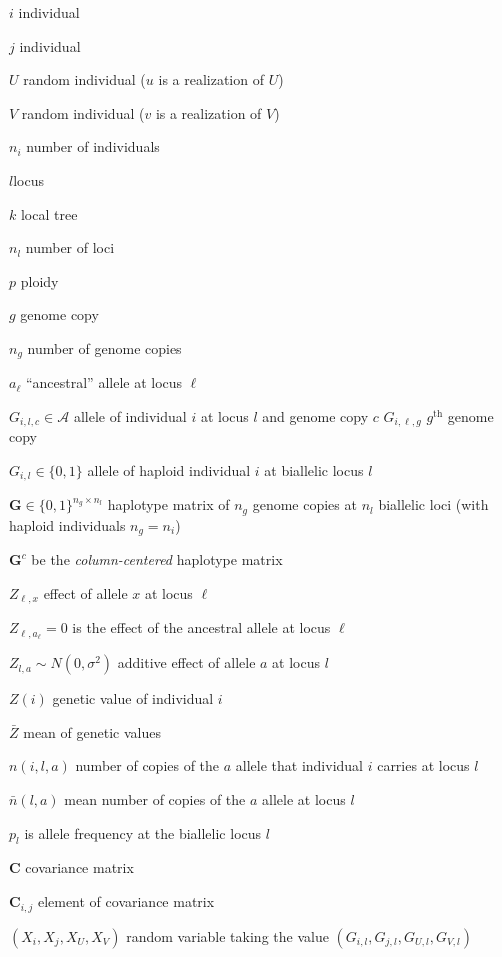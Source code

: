 $i$ individual

$j$ individual

$U$ random individual ($u$ is a realization of $U$) %

$V$ random individual ($v$ is a realization of $V$) %

$n_i$ number of individuals

$l$locus %

$k$ local tree

$n_l$ number of loci

$p$ ploidy

$g$ genome copy

$n_g$ number of genome copies

$a_\ell$ ``ancestral'' allele at locus $\ell$

$G_{i,l,c} \in \mathcal{A}$ allele of individual $i$ at locus $l$ and genome copy $c$
$G_{i,\ell,g}$ $g^\text{th}$ genome copy

$G_{i,l} \in \lbrace 0, 1 \rbrace$ allele of haploid individual $i$ at biallelic locus $l$

$\mathbf{G} \in \{0, 1\}^{n_g \times n_l}$ haplotype matrix of $n_g$ genome copies at $n_l$ biallelic loci (with haploid individuals $n_g = n_i$)

$\mathbf{G}^c$ be the \textit{column-centered} haplotype matrix

$Z_{\ell,x}$ effect of allele $x$ at locus $\ell$

$Z_{\ell,a_\ell} = 0$ is the effect of the ancestral allele at locus $\ell$

$Z_{l,a} \sim N(0, \sigma^2)$ additive effect of allele $a$ at locus $l$

$Z(i)$ genetic value of individual $i$

$\bar{Z}$ mean of genetic values

$n(i,l,a)$ number of copies of the $a$ allele that individual $i$ carries at locus $l$

$\bar{n}(l,a)$ mean number of copies of the $a$ allele at locus $l$

$p_l$ is allele frequency at the biallelic locus $l$

$\mathbf{C}$ covariance matrix

$\mathbf{C}_{i,j}$ element of covariance matrix

$(X_i, X_j, X_U, X_V)$ random variable taking the value $(G_{i,l}, G_{j,l}, G_{U,l}, G_{V,l})$

